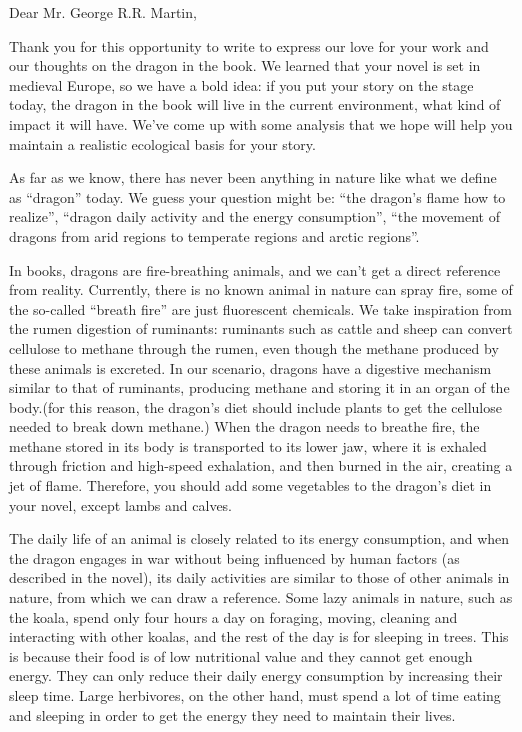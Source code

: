 
\clearpage
{}
\begin{memo}[Memorandum]
Dear Mr. George R.R. Martin,

Thank you for this opportunity to write to express our love for your work and our thoughts on the dragon in the book. We learned that your novel  is set in medieval Europe, so we have a bold idea: if you put your story on the stage today, the dragon in the book will live in the current environment, what kind of impact it will have. We've come up with some analysis that we hope will help you maintain a realistic ecological basis for your story.

As far as we know, there has never been anything in nature like what we define as ``dragon'' today. We guess your question might be: ``the dragon's flame how to realize'', ``dragon daily activity and the energy consumption'', ``the movement of dragons from arid regions to temperate regions and arctic regions''.

In books, dragons are fire-breathing animals, and we can't get a direct reference from reality. Currently, there is no known animal in nature can spray fire, some of the so-called ``breath fire'' are just fluorescent chemicals. We take inspiration from the rumen digestion of ruminants: ruminants such as cattle and sheep can convert cellulose to methane through the rumen, even though the methane produced by these animals is excreted. In our scenario, dragons have a digestive mechanism similar to that of ruminants, producing methane and storing it in an organ of the body.(for this reason, the dragon's diet should include plants to get the cellulose needed to break down methane.)  When the dragon needs to breathe fire, the methane stored in its body is transported to its lower jaw, where it is exhaled through friction and high-speed exhalation, and then burned in the air, creating a jet of flame. Therefore, you should add some vegetables to the dragon's diet in your novel, except lambs and calves.

The daily life of an animal is closely related to its energy consumption, and when the dragon engages in war without being influenced by human factors (as described in the novel), its daily activities are similar to those of other animals in nature, from which we can draw a reference. Some lazy animals in nature, such as the koala, spend only four hours a day on foraging, moving, cleaning and interacting with other koalas, and the rest of the day is for sleeping in trees. This is because their food is of low nutritional value and they cannot get enough energy. They can only reduce their daily energy consumption by increasing their sleep time. Large herbivores, on the other hand, must spend a lot of time eating and sleeping in order to get the energy they need to maintain their lives.


\end{memo}
